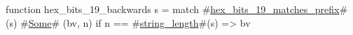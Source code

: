 function hex_bits_19_backwards s =
  match #\hyperref[sailRISCVzhexzybitszy19zymatcheszyprefix]{hex\_bits\_19\_matches\_prefix}#(s) {
      #\hyperref[sailRISCVzSome]{Some}# (bv, n) if n == #\hyperref[sailRISCVzstringzylength]{string\_length}#(s) => bv
  }
